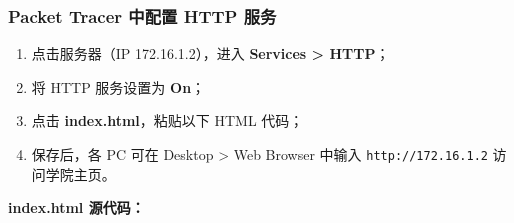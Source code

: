 \documentclass[12pt,a4paper]{ctexart}
\begin{document}
\subsubsection{Packet Tracer 中配置 HTTP 服务}

\begin{enumerate}
  \item 点击服务器（IP 172.16.1.2），进入 \textbf{Services > HTTP}；
  \item 将 HTTP 服务设置为 \textbf{On}；
  \item 点击 \textbf{index.html}，粘贴以下 HTML 代码；
  \item 保存后，各 PC 可在 Desktop > Web Browser 中输入 \texttt{http://172.16.1.2} 访问学院主页。
\end{enumerate}

\textbf{index.html 源代码：}
\end{document}
